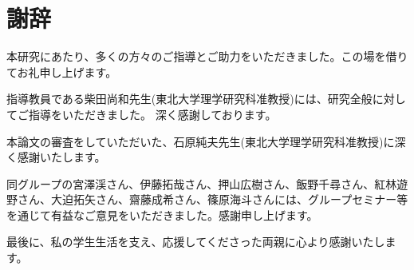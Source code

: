 \backmatter
\chapter{謝辞}
本研究にあたり、多くの方々のご指導とご助力をいただきました。この場を借りてお礼申し上げます。

指導教員である柴田尚和先生(東北大学理学研究科准教授)には、研究全般に対してご指導をいただきました。
深く感謝しております。

本論文の審査をしていただいた、石原純夫先生(東北大学理学研究科准教授)に深く感謝いたします。

同グループの宮澤渓さん、伊藤拓哉さん、押山広樹さん、飯野千尋さん、紅林遊野さん、大迫拓矢さん、齋藤成希さん、篠原海斗さんには、グループセミナー等を通じて有益なご意見をいただきました。感謝申し上げます。

最後に、私の学生生活を支え、応援してくださった両親に心より感謝いたします。
